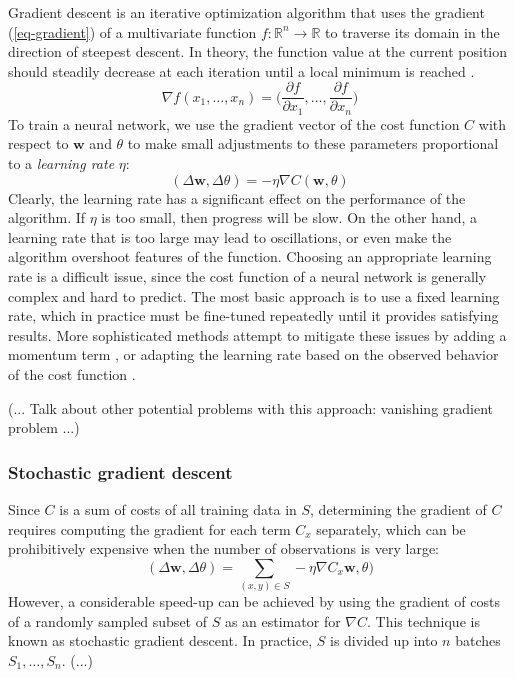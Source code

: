 Gradient descent is an iterative optimization algorithm that uses the gradient (\ref{eq-gradient}) of a multivariate function \(f:\mathbb{R}^n\to\mathbb{R}\) to traverse its domain in the direction of steepest descent. In theory, the function value at the current position should steadily decrease at each iteration until a local minimum is reached \cite{TODO}. 
\begin{equation}\label{eq-gradient}
    \nabla f(x_1,\ldots,x_n) = \bigg(\frac{\partial f}{\partial x_1},\ldots,\frac{\partial f}{\partial x_n} \bigg)
\end{equation}
To train a neural network, we use the gradient vector of the cost function \(C\) with respect to \(\mathbf{w}\) and \(\theta\) to make small adjustments to these parameters proportional to a \emph{learning rate} \(\eta\):
\begin{equation*}
    (\Delta\mathbf{w},\Delta\theta) = -\eta \nabla C(\mathbf{w},\theta)
\end{equation*}
Clearly, the learning rate has a significant effect on the performance of the algorithm. If \(\eta\) is too small, then progress will be slow. On the other hand, a learning rate that is too large may lead to oscillations, or even make the algorithm overshoot features of the function. Choosing an appropriate learning rate is a difficult issue, since the cost function of a neural network is generally complex and hard to predict. The most basic approach is to use a fixed learning rate, which in practice must be fine-tuned repeatedly until it provides satisfying results. More sophisticated methods attempt to mitigate these issues by adding a momentum term \cite{TODO}, or adapting the learning rate based on the observed behavior of the cost function \cite{TODO}. 


(... Talk about other potential problems with this approach: vanishing gradient problem ...)

\subsubsection{Stochastic gradient descent}

\noindent Since \(C\) is a sum of costs of all training data in \(S\), determining the gradient of \(C\) requires computing the gradient for each term \(C_x\) separately, which can be prohibitively expensive when the number of observations is very large:
\begin{equation*}
    (\Delta\mathbf{w},\Delta\theta) = \sum_{(x,y)\in S} -\eta\nabla C_x\mathbf{w},\theta)
\end{equation*}
However, a considerable speed-up can be achieved by using the gradient of costs of a randomly sampled subset of \(S\) as an estimator for \(\nabla C\). This technique is known as stochastic gradient descent. In practice, \(S\) is divided up into \(n\) batches \(S_1,\ldots,S_n\). (...)


